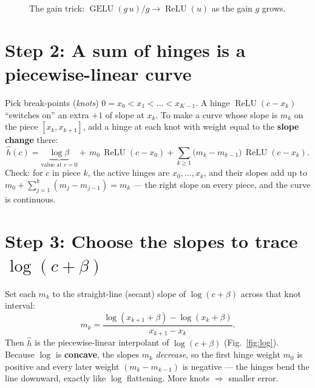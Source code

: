 \documentclass[11pt]{article}
\newcommand{\relu}{\operatorname{ReLU}}
\newcommand{\gelu}{\operatorname{GELU}}
\begin{document}
\begin{figure}[h]
\centering
{}
\caption{The gain trick: $\gelu(g\,u)/g\to\relu(u)$ as the gain $g$ grows.}
\label{fig:hinge}
\end{figure}

\section{Step 2: A sum of hinges is a piecewise-linear curve}

Pick break-points (\emph{knots}) $0=x_0<x_1<\dots<x_{K-1}$. A hinge $\relu(c-x_k)$
``switches on'' an extra $+1$ of slope at $x_k$. To make a curve whose slope is $m_k$ on
the piece $[x_k,x_{k+1}]$, add a hinge at each knot with weight equal to the
\textbf{slope change} there:
\begin{equation}\label{eq:pl}
\hat h(c)=\underbrace{\log\beta}_{\text{value at }c=0}
+\,m_0\,\relu(c-x_0)
+\sum_{k\ge 1}\big(m_k-m_{k-1}\big)\,\relu(c-x_k).
\end{equation}
Check: for $c$ in piece $k$, the active hinges are $x_0,\dots,x_k$, and their slopes add up to
$m_0+\sum_{j=1}^{k}(m_j-m_{j-1})=m_k$ --- the right slope on every piece, and the curve is continuous.

\section{Step 3: Choose the slopes to trace $\log(c+\beta)$}

Set each $m_k$ to the straight-line (secant) slope of $\log(c+\beta)$ across that knot interval:
\begin{equation}\label{eq:slopes}
m_k=\frac{\log(x_{k+1}+\beta)-\log(x_k+\beta)}{x_{k+1}-x_k}.
\end{equation}
Then $\hat h$ is the piecewise-linear interpolant of $\log(c+\beta)$ (Fig.~\ref{fig:log}).
Because $\log$ is \textbf{concave}, the slopes $m_k$ \emph{decrease}, so the first hinge
weight $m_0$ is positive and every later weight $(m_k-m_{k-1})$ is negative --- the hinges
bend the line downward, exactly like $\log$ flattening. More knots $\Rightarrow$ smaller error.
\end{document}
